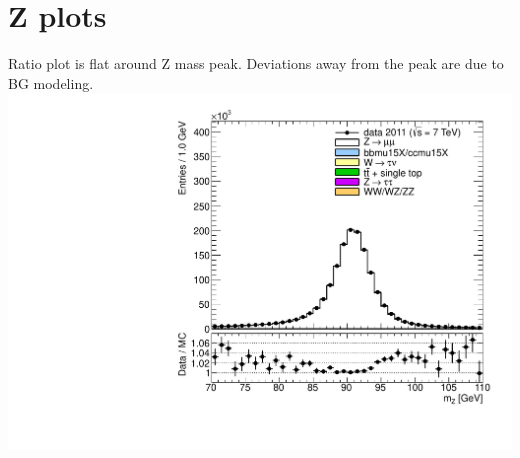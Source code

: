 \section{ Z plots }

{
\centering
Ratio plot is flat around Z mass peak. Deviations away from the peak are due to BG modeling.
\newline
\includegraphics[height=0.9\textheight]{dates/20121119/figures/zplots/zm_nomatch.pdf}
}

